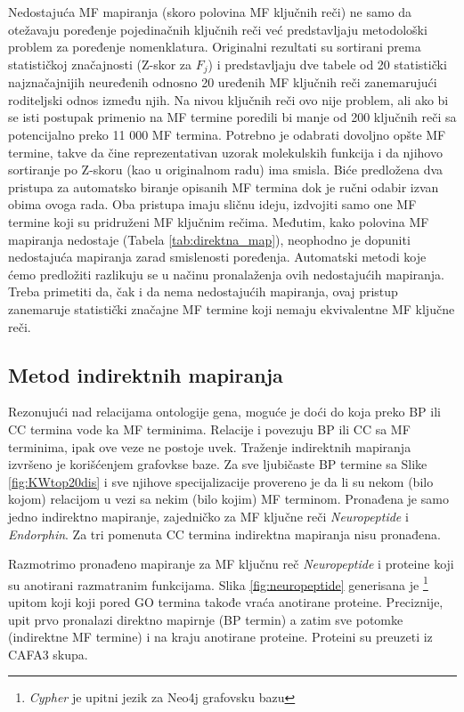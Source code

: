 Nedostajuća MF mapiranja (skoro polovina MF ključnih reči) ne samo da otežavaju
poređenje pojedinačnih ključnih reči već predstavljaju metodološki problem za
poređenje nomenklatura.  Originalni rezultati su sortirani prema statističkoj
značajnosti (Z-skor za $F_j$) i predstavljaju dve tabele od 20 statistički
najznačajnijih neuređenih odnosno 20 uređenih MF ključnih reči zanemarujući
roditeljski odnos između njih. Na nivou ključnih reči ovo nije problem, ali ako
bi se isti postupak primenio na MF termine poredili bi manje od 200 ključnih
reči sa potencijalno preko 11 000 MF termina. Potrebno je odabrati dovoljno
opšte MF termine, takve da čine reprezentativan uzorak molekulskih funkcija i
da njihovo sortiranje po Z-skoru (kao u originalnom radu) ima smisla.  Biće
predložena dva pristupa za automatsko biranje opisanih MF termina dok je ručni
odabir izvan obima ovoga rada.  Oba pristupa imaju sličnu ideju, izdvojiti samo
one MF termine koji su pridruženi MF ključnim rečima. Međutim, kako polovina MF
mapiranja nedostaje (Tabela \ref{tab:direktna_map}), neophodno je dopuniti
nedostajuća mapiranja zarad smislenosti poređenja.  Automatski metodi koje ćemo
predložiti razlikuju se u načinu pronalaženja ovih nedostajućih mapiranja.
Treba primetiti da, čak i da nema nedostajućih mapiranja, ovaj pristup
zanemaruje statistički značajne MF termine koji nemaju ekvivalentne MF ključne
reči. 



\clearpage

\subsection{Metod indirektnih mapiranja}

Rezonujući nad relacijama ontologije gena, moguće je doći do
 koja preko BP ili CC termina vode ka MF
terminima. Relacije  i  povezuju BP ili CC
sa MF terminima, ipak ove veze ne postoje uvek.  Traženje indirektnih mapiranja
izvršeno je korišćenjem  grafovkse baze. Za sve
ljubičaste BP termine sa Slike \ref{fig:KWtop20dis} i sve njihove
specijalizacije provereno je da li su nekom (bilo kojom) relacijom u vezi sa
nekim (bilo kojim) MF terminom. Pronađena je samo jedno indirektno mapiranje,
zajedničko za MF ključne reči \textit{Neuropeptide} i \textit{Endorphin}. Za tri
pomenuta CC termina indirektna mapiranja nisu pronađena. 


Razmotrimo pronađeno mapiranje za MF ključnu reč \textit{Neuropeptide} i
proteine koji su anotirani razmatranim funkcijama. Slika \ref{fig:neuropeptide}
generisana je \footnote{\textit{Cypher} je upitni jezik za
Neo4j grafovsku bazu} upitom koji koji pored GO termina takođe vraća anotirane
proteine. Preciznije, upit prvo pronalazi direktno mapirnje (BP termin)  a
zatim sve potomke (indirektne MF termine) i na kraju anotirane proteine.
Proteini su preuzeti iz CAFA3 skupa. 

